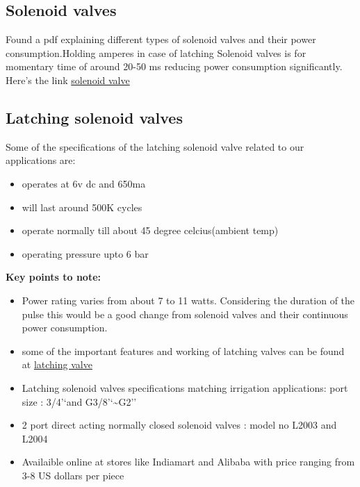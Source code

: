 \documentclass[16pt]{article}
\begin{document}
\subsection{Solenoid valves}

\vspace{0.3cm}

  Found a pdf explaining different types of solenoid valves and their
  power consumption.Holding amperes in case of latching Solenoid valves is
  for momentary time of around 20-50 ms reducing power consumption
  significantly. Here's the link \href{http://www.ascovalve.com/common/pdffiles/product/engineeringr5.pdf}{solenoid valve}

\vspace{0.3cm}

\subsection{Latching solenoid valves}

  Some of the specifications of the latching solenoid valve related to our
  applications are:
  
  \begin{itemize}

  \item
    operates at 6v dc and 650ma
  \item
    will last around 500K cycles
  \item
    operate normally till about 45 degree celcius(ambient temp)
  \item
    operating pressure upto 6 bar
  \end{itemize}
 

  \textbf{Key points to note:}

  \begin{itemize}

  \item
    Power rating varies from about 7 to 11 watts. Considering the duration
    of the pulse this would be a good change from solenoid valves and
    their continuous power consumption.
  \item
    some of the important features and working of latching valves can be
    found at \href{www.giplindia.com/latching-solenoid-valve.htm}{latching valve}  
    
  \item
    Latching solenoid valves specifications matching irrigation
    applications: port size : 3/4'`and G3/8'`\textasciitilde{}G2''
  \item
    2 port direct acting normally closed solenoid valves : model no L2003
    and L2004
  \item
    Availaible online at stores like Indiamart and Alibaba with price
    ranging from 3-8 US dollars per piece
  \end{itemize}
  
\end{document}
